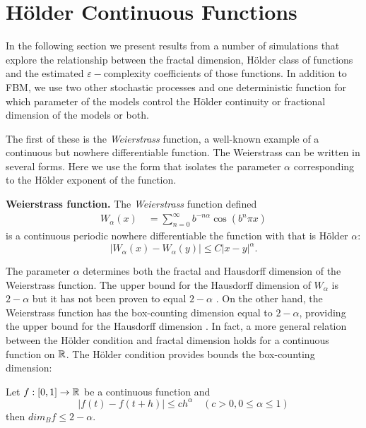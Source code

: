 \section{H\"older Continuous Functions} 

In the 
following section we present results from a
number of simulations that explore the relationship 
between the fractal dimension, H\"older class of 
functions and the estimated $\varepsilon-$complexity coefficients
of those functions. In addition to FBM, we use two
other stochastic processes and one deterministic function 
for which parameter of the models control the H\"older continuity
or fractional dimension of the models or both. 

The first of these is the \textit{Weierstrass} function, 
a well-known example of a continuous but nowhere differentiable function. The Weierstrass can be written in several forms. Here we use the form that isolates the parameter $\alpha$ corresponding to the H\"older exponent of the function. 
\begin{defn}\textbf{Weierstrass function.} \label{def:weierstrass}
  The \textit{Weierstrass} function defined
  \begin{align}
    W_{\alpha}(x) 
  \hspace{1em}= \sum_{n = 0}^{\infty} b^{-n \alpha} \cos(b^n \pi x)
  \end{align}
  is a continuous 
  periodic nowhere differentiable the function with 
  that is H\"older $\alpha$:  
  \[
  \left| W_{\alpha}(x) - W_{\alpha}(y) \right| 
  \leq C \left| x - y \right|^{\alpha}.
\]  
\end{defn}
The parameter $\alpha$ determines both the fractal and 
Hausdorff dimension of the Weierstrass function.
The upper bound for the Hausdorff dimension of $W_{\alpha}$ 
is $2-\alpha$ but it has not been proven to equal $2-\alpha$ 
\cite{hunt1998}. On the other hand, the Weierstrass function has the box-counting dimension equal to $2-\alpha$, providing the upper bound for the Hausdorff dimension \cite{falconer2003}. 
In fact, a more general relation between the 
 H\"older condition and fractal dimension holds for 
a continuous function on $\mathbb R$. The H\"older 
condition provides bounds the box-counting dimension:
\begin{prop}
  Let $f:[0, 1] \to \mathbb R$ be a continuous function 
  and 
  \[  
    |f(t) - f(t + h)| \leq ch^{\alpha} \hspace{1em} 
    (c > 0, 0 \leq \alpha \leq 1)
  \]
  then $dim_B f \leq 2 - \alpha $\cite{falconer2003}.
\end{prop}

